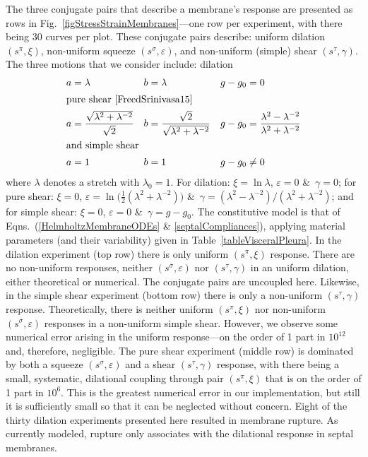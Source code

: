 The three conjugate pairs that describe a membrane's response are presented as rows in Fig.~\ref{figStressStrainMembranes}---one row per experiment, with there being 30 curves per plot.  These conjugate pairs describe: uniform dilation $( s^{\pi} , \xi )$, non-uniform squeeze $( s^{\sigma} , \varepsilon )$, and non-uniform (simple) shear $( s^{\tau} , \gamma )$.  The three motions that we consider include: \newline dilation
\begin{subequations}
    \label{membraneExperiments}
    \begin{align}
    a & = \lambda & b & = \lambda & g - g_0 & = 0 
    \label{dilationExperiment}\\
    \intertext{pure shear \cite{FreedSrinivasa15}}
    a & = \frac{\sqrt{\lambda^2 + \lambda^{-2}}}{\sqrt{2}} & 
    b & = \frac{\sqrt{2}}{\sqrt{\lambda^2 + \lambda^{-2}}} & g - g_0 &  = 
    \frac{\lambda^2 - \lambda^{-2}}{\lambda^2 + \lambda^{-2}} 
    \label{pureShearExperiment} \\
    \intertext{and simple shear}
    a & = 1 & b & = 1 & g - g_0 & \neq 0
    \label{simpleShearExperiment}
    \end{align}
\end{subequations}
where $\lambda$ denotes a stretch with $\lambda_0 = 1$.  For dilation: $\xi = \ln \lambda$, $\varepsilon = 0$ \&\ $\gamma = 0$; for pure shear: $\xi = 0$, $\varepsilon = \ln \bigl( \tfrac{1}{2} ( \lambda^2 + \lambda^{-2}) \bigr)$ \&\ $\gamma = ( \lambda^2 - \lambda^{-2} ) / (\lambda^2 + \lambda^{-2})$; and for simple shear: $\xi = 0$, $\varepsilon = 0$ \&\ $\gamma = g - g_0$.
The constitutive model is that of Eqns.\ (\ref{HelmholtzMembraneODEs} \& \ref{septalCompliances}), applying material parameters (and their variability) given in Table~\ref{tableVisceralPleura}.  In the dilation experiment (top row) there is only uniform $( s^{\pi} \! , \xi)$ response.  There are no non-uniform responses, neither $( s^{\sigma} \! , \varepsilon)$ nor $( s^{\tau} \! , \gamma)$ in an uniform dilation, either theoretical or numerical.  The conjugate pairs are uncoupled here.  Likewise, in the simple shear experiment (bottom row) there is only a non-uniform $( s^{\tau} \! , \gamma)$ response.  Theoretically, there is neither uniform $( s^{\pi} \! , \xi)$ nor non-uniform $( s^{\sigma} \! , \varepsilon)$ responses in a non-uniform simple shear.  However, we observe some numerical error arising in the uniform response---on the order of 1 part in $10^{12}$ and, therefore, negligible.  The pure shear experiment (middle row) is dominated by both a squeeze $( s^{\sigma} \! , \varepsilon)$ and a shear  $( s^{\tau} \! , \gamma)$ response, with there being a small, systematic, dilational coupling through pair $( s^{\pi} \! , \xi)$ that is on the order of 1 part in $10^6$.  This is the greatest numerical error in our implementation, but still it is sufficiently small so that it can be neglected without concern.  Eight of the thirty dilation experiments presented here resulted in membrane rupture.  As currently modeled, rupture only associates with the dilational response in septal membranes.

